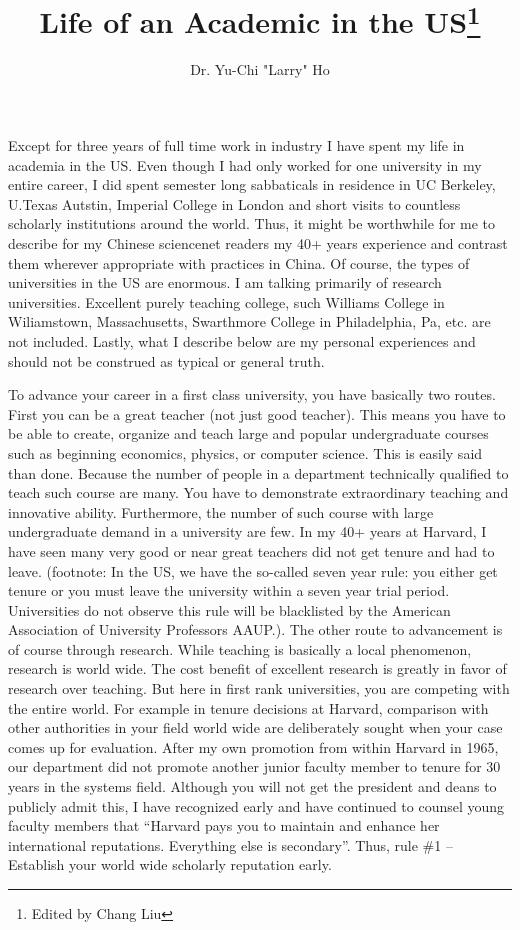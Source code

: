\documentclass{article}
\author{Dr. Yu-Chi "Larry" Ho}
\title{Life of an Academic in the US\footnote{Edited by Chang Liu}}
\begin{document}
\maketitle

Except for three years of full time work in industry I have spent my life in academia in  the US.  Even though I had only worked for one university in my entire career, I did spent semester long sabbaticals in residence in UC Berkeley, U.Texas Autstin, Imperial College in London and short visits to countless scholarly institutions around the world. Thus, it might be worthwhile for me to describe for my Chinese sciencenet readers my 40+ years experience and contrast them wherever appropriate with practices in China. Of course, the types of universities in the US are enormous. I am talking primarily of research universities. Excellent purely teaching college, such Williams College in Wiliamstown, Massachusetts, Swarthmore College in Philadelphia, Pa, etc. are not included. Lastly, what I describe below are my personal experiences and should not be construed as typical or general truth.


To advance your career in a first class university, you have basically two routes.  First you can be a great teacher (not just good teacher). This means you have to be able to create, organize and teach large and popular undergraduate courses such as beginning economics, physics, or computer science. This is easily said than done. Because the number of people in a department technically qualified to teach such course are many. You have to demonstrate extraordinary teaching and innovative ability. Furthermore, the number of such course with large undergraduate demand in a university are few. In my 40+ years at Harvard, I have seen many very good or near great teachers did not get tenure and had to leave. (footnote: In the US, we have the so-called seven year rule: you either get tenure or you must leave the university within a seven year trial period. Universities do not observe this rule will be blacklisted by the American Association of University Professors AAUP.). The other route to advancement is of course through research. While teaching is basically a local phenomenon, research is world wide. The cost benefit of excellent research is greatly in favor of research over teaching. But here in first rank universities, you are competing with the entire world. For example in tenure decisions at Harvard, comparison with other authorities in your field world wide are deliberately sought when your case comes up for evaluation. After my own promotion from within Harvard in 1965, our department did not promote another junior faculty member to tenure for 30 years in the systems field. Although you will not get the president and deans to publicly admit this, I have recognized early and have continued to counsel young faculty members that ``Harvard pays you to maintain and enhance her international reputations. Everything else is secondary''.  Thus, rule \#1 – Establish your world wide scholarly reputation early.
\end{document}
